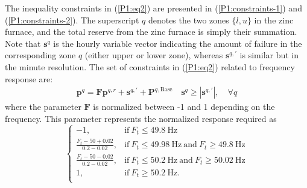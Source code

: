 \documentclass[conference]{IEEEtran}
\begin{document}
The inequality constraints in (\ref{P1:eq2}) are presented in (\ref{P1:constraints-1}) and (\ref{P1:constraints-2}).
The superscript $q$ denotes the two zones $\{l, u\}$ in the zinc furnace, and the total reserve from the zinc furnace is simply their summation. Note that $\bm{s}^{q}$ is the hourly variable vector indicating the amount of failure in the corresponding zone $q$ (either upper or lower zone), whereas $\bm{s}^{q, \prime}$ is similar but in the minute resolution. The set of constraints in (\ref{P1:eq2}) related to frequency response are:
%
\begingroup
\allowdisplaybreaks
\begin{align}
    \bm{p}^{q} = \bm{F} \bm{p}^{q,r} + \bm{s}^{q, \prime} + \bm{P}^{q, \text{Base}}
    \quad \bm{s}^{q} \geq |\bm{s}^{q, \prime}|,
    \quad \forall{q}  \label{P1:constraints-1}
\end{align}
\endgroup
where the parameter $\bm{F}$ is normalized between -1 and 1 depending on the frequency. This parameter represents the normalized response required \cite{energinet:prequalification} as
%
\begingroup
\allowdisplaybreaks
\begin{equation}
    \begin{cases}
        -1,                             & \text{if}\ F_{t} \leq 49.8\ \text{Hz}                                          \\
        \frac{F_{t}-50+0.02}{0.2-0.02}, & \text{if}\ F_{t} \leq 49.98\ \text{Hz}\ \text{and}\ F_{t} \geq 49.8\ \text{Hz} \\
        \frac{F_{t}-50-0.02}{0.2-0.02}, & \text{if}\ F_{t} \leq 50.2\ \text{Hz}\ \text{and}\ F_{t} \geq 50.02\ \text{Hz} \\
        1,                              & \text{if}\ F_{t} \geq 50.2\ \text{Hz}.                                         \\
    \end{cases}
\end{equation}
\endgroup
\end{document}
